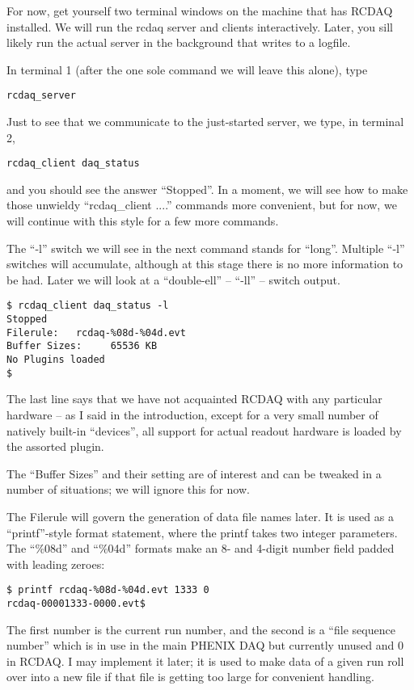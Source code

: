 \documentclass{article}[11pt]
\begin{document}
For now, get yourself two terminal windows on the machine that has
RCDAQ installed. We will run the rcdaq server and clients
interactively. Later, you sill likely run the actual server in the
background that writes to a logfile.

In terminal 1 (after the one sole command we will leave this alone), type
\begin{verbatim}
rcdaq_server 
\end{verbatim}

Just to see that we communicate to the just-started server, we type, in terminal 2,
\begin{verbatim}
rcdaq_client daq_status 
\end{verbatim}

and you should see the answer ``Stopped''. In a moment, we will see
how to make those unwieldy ``rcdaq\_client ....'' commands more
convenient, but for now, we will continue with this style for a few
more commands.

The ``-l'' switch we will see in the next command stands for
``long''. Multiple ``-l'' switches will accumulate, although 
at this stage there is no more information to be had. Later we will look
at a ``double-ell'' -- ``-ll'' -- switch output.  

\begin{verbatim}
$ rcdaq_client daq_status -l
Stopped
Filerule:   rcdaq-%08d-%04d.evt
Buffer Sizes:     65536 KB
No Plugins loaded
$
\end{verbatim}

The last line says that we have not acquainted RCDAQ with any particular
hardware -- as I said in the introduction, except for a very small
number of natively built-in ``devices'', all support for actual
readout hardware is loaded by the assorted plugin.

The ``Buffer Sizes'' and their setting are of interest and can be
tweaked in a number of situations; we will ignore this for now.

The Filerule will govern the generation of data file names later. It
is used as a ``printf''-style format statement, where the printf takes
two integer parameters. The ``\%08d'' and ``\%04d'' formats make an 8-
and 4-digit number field padded with leading zeroes:

\begin{verbatim}
$ printf rcdaq-%08d-%04d.evt 1333 0 
rcdaq-00001333-0000.evt$
\end{verbatim}

The first number is the current run number, and the second is a ``file
sequence number'' which is in use in the main PHENIX DAQ but currently
unused and 0 in RCDAQ. I may implement it later; it is used to make
data of a given run roll over into a new file if that file is getting
too large for convenient handling. 
\end{document}
